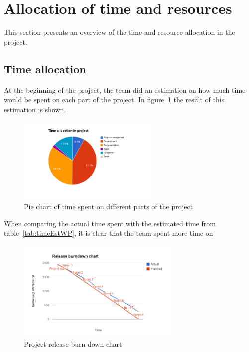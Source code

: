 \section{Allocation of time and resources}
\label{sec:timeSpent}
This section presents an overview of the time and resource allocation in the project.

\subsection{Time allocation}
At the beginning of the project, the team did an estimation on how much time would be spent on each part of the project. In figure~\ref{fig:piechart} the result of this estimation is shown.

\begin{figure}[H]
\centering
\includegraphics[width=0.6\textwidth, clip, trim=4cm 2cm 4cm 1cm]{ch/retrospect/fig/timePie.png}
\caption{Pie chart of time spent on different parts of the project}
\label{fig:piechart}
\end{figure}

When comparing the actual time spent with the estimated time from table~\ref{tab:timeEstWP}, it is clear that the team spent more time on 

\begin{figure}[H]
\centering
\includegraphics[width=0.7\textwidth, clip, trim=1.1cm 0.5cm 1.2cm 1cm]{ch/retrospect/fig/release.png}
\caption{Project release burn down chart}
\label{fig:release}
\end{figure}

